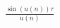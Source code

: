 \documentclass[preview]{standalone}
\begin{document}
\begin{align*}
\frac {\sin \left(u(n)\right)\tau} {u(n)}
\end{align*}
\end{document}
